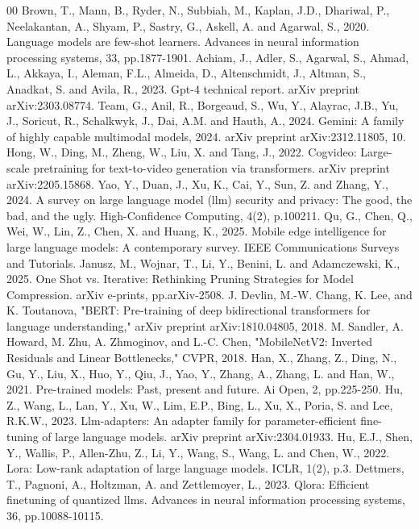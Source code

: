 \documentclass[11pt]{IEEEtran}
\begin{document}
\begin{thebibliography}{00}
 Brown, T., Mann, B., Ryder, N., Subbiah, M., Kaplan, J.D., Dhariwal, P., Neelakantan, A., Shyam, P., Sastry, G., Askell, A. and Agarwal, S., 2020. Language models are few-shot learners. Advances in neural information processing systems, 33, pp.1877-1901.
 Achiam, J., Adler, S., Agarwal, S., Ahmad, L., Akkaya, I., Aleman, F.L., Almeida, D., Altenschmidt, J., Altman, S., Anadkat, S. and Avila, R., 2023. Gpt-4 technical report. arXiv preprint arXiv:2303.08774.
 Team, G., Anil, R., Borgeaud, S., Wu, Y., Alayrac, J.B., Yu, J., Soricut, R., Schalkwyk, J., Dai, A.M. and Hauth, A., 2024. Gemini: A family of highly capable multimodal models, 2024. arXiv preprint arXiv:2312.11805, 10.
 Hong, W., Ding, M., Zheng, W., Liu, X. and Tang, J., 2022. Cogvideo: Large-scale pretraining for text-to-video generation via transformers. arXiv preprint arXiv:2205.15868.
 Yao, Y., Duan, J., Xu, K., Cai, Y., Sun, Z. and Zhang, Y., 2024. A survey on large language model (llm) security and privacy: The good, the bad, and the ugly. High-Confidence Computing, 4(2), p.100211.
 Qu, G., Chen, Q., Wei, W., Lin, Z., Chen, X. and Huang, K., 2025. Mobile edge intelligence for large language models: A contemporary survey. IEEE Communications Surveys and Tutorials.
 Janusz, M., Wojnar, T., Li, Y., Benini, L. and Adamczewski, K., 2025. One Shot vs. Iterative: Rethinking Pruning Strategies for Model Compression. arXiv e-prints, pp.arXiv-2508.
J. Devlin, M.-W. Chang, K. Lee, and K. Toutanova, "BERT: Pre-training of deep bidirectional transformers for language understanding," arXiv preprint arXiv:1810.04805, 2018.
M. Sandler, A. Howard, M. Zhu, A. Zhmoginov, and L.-C. Chen, "MobileNetV2: Inverted Residuals and Linear Bottlenecks," CVPR, 2018.
Han, X., Zhang, Z., Ding, N., Gu, Y., Liu, X., Huo, Y., Qiu, J., Yao, Y., Zhang, A., Zhang, L. and Han, W., 2021. Pre-trained models: Past, present and future. Ai Open, 2, pp.225-250.
 Hu, Z., Wang, L., Lan, Y., Xu, W., Lim, E.P., Bing, L., Xu, X., Poria, S. and Lee, R.K.W., 2023. Llm-adapters: An adapter family for parameter-efficient fine-tuning of large language models. arXiv preprint arXiv:2304.01933.
 Hu, E.J., Shen, Y., Wallis, P., Allen-Zhu, Z., Li, Y., Wang, S., Wang, L. and Chen, W., 2022. Lora: Low-rank adaptation of large language models. ICLR, 1(2), p.3.
 Dettmers, T., Pagnoni, A., Holtzman, A. and Zettlemoyer, L., 2023. Qlora: Efficient finetuning of quantized llms. Advances in neural information processing systems, 36, pp.10088-10115.

\end{thebibliography}
\end{document}
